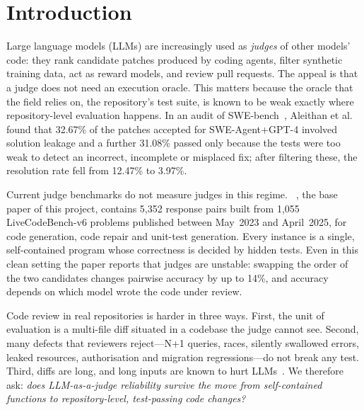 \section{Introduction}
\label{sec:intro}

Large language models (LLMs) are increasingly used as \emph{judges} of other
models' code: they rank candidate patches produced by coding agents, filter
synthetic training data, act as reward models, and review pull requests.  The
appeal is that a judge does not need an execution oracle.  This matters
because the oracle that the field relies on, the repository's test suite, is
known to be weak exactly where repository-level evaluation happens.  In an
audit of SWE-bench~\cite{jimenez2024swebench}, Aleithan et
al.~\cite{aleithan2024swebenchplus} found that 32.67\% of the patches accepted
for SWE-Agent+GPT-4 involved solution leakage and a further 31.08\% passed only
because the tests were too weak to detect an incorrect, incomplete or misplaced
fix; after filtering these, the resolution rate fell from 12.47\% to 3.97\%.

Current judge benchmarks do not measure judges in this regime.
\CJB{}~\cite{jiang2025codejudgebench}, the base paper of this project, contains
5{,}352 response pairs built from 1{,}055 LiveCodeBench-v6 problems published
between May~2023 and April~2025, for code generation, code repair and unit-test
generation.  Every instance is a single, self-contained program whose
correctness is decided by hidden tests.  Even in this clean setting the paper
reports that judges are unstable: swapping the order of the two candidates
changes pairwise accuracy by up to 14\%, and accuracy depends on which model
wrote the code under review.

Code review in real repositories is harder in three ways.  First, the unit of
evaluation is a multi-file diff situated in a codebase the judge cannot see.
Second, many defects that reviewers reject---N+1 queries, races, silently
swallowed errors, leaked resources, authorisation and migration regressions---do
not break any test.  Third, diffs are long, and long inputs are known to hurt
LLMs~\cite{liu2024lost}.  We therefore ask: \emph{does LLM-as-a-judge
reliability survive the move from self-contained functions to
repository-level, test-passing code changes?}

